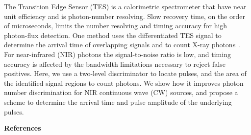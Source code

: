 \documentclass[portrait,a0,final]{a0poster}
\newenvironment{poster}{
  \begin{center}
  \begin{minipage}[c]{0.98\textwidth}
}{
  \end{minipage}
  \end{center}
}
\begin{document}
\begin{poster}
\vspace{0.2cm}



\begin{center}
\end{center}
    The Transition Edge Sensor (TES) is a calorimetric spectrometer that have near unit efficiency and is photon-number resolving.
    Slow recovery time, on the order of microseconds, limits the number resolving and timing accuracy for high photon-flux detection.
    One method uses the differentiated TES signal to determine the arrival time of overlapping signals and to count X-ray photons~\cite{Fowler:2015ef}.
    For near-infrared (NIR) photons the signal-to-noise ratio is low, and timing accuracy is affected by the bandwidth limitations necessary to reject false positives.
    Here, we use a two-level discriminator to locate pulses, and the area of the identified signal regions to count photons.
    We show how it
    improves photon number discrimination for NIR continuous wave (CW) sources,
    and propose a scheme to determine the arrival time and pulse amplitude of the underlying pulses.

\begin{multicols}{2}
\setlength{\parskip}{0ex}
% 
\columnbreak


% 
% 
% 
\end{multicols}

\begin{center}{\bf \large \textsf {References}}\end{center}


\end{poster}
\end{document}
